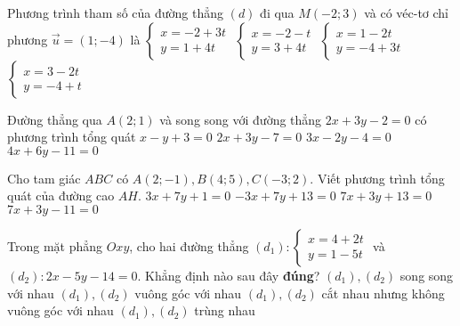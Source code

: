 \begin{ex}%
Phương trình tham số của đường thẳng $ (d) $ đi qua $ M(-2;3) $ và có véc-tơ chỉ phương $ \vec{u}=(1;-4) $ là
\choice
{$\begin{cases}	x=-2+3t\\y=1+4t \end{cases}	$}
{\True $\begin{cases}	x=-2-t\\y=3+4t \end{cases}	$}
{$\begin{cases}	x=1-2t\\y=-4+3t \end{cases}	$}
{$\begin{cases}	x=3-2t\\y=-4+t \end{cases}	$}
\end{ex}
\begin{ex}%
 Đường thẳng qua $ A(2;1) $ và song song với đường thẳng $ 2x+3y-2=0 $ có phương trình tổng quát
	\choice
	{$x-y+3=0$}
	{\True $2x+3y-7=0$}
	{$3x-2y-4=0$}
	{$4x+6y-11=0$}
\end{ex}
\begin{ex}%
 Cho tam giác $ ABC $ có $ A(2;-1), B(4;5), C(-3;2) $. Viết phương trình tổng quát của đường cao $ AH $.
	\choice
	{$3x+7y+1=0$}
	{$-3x+7y+13=0$}
	{$7x+3y+13=0$}
	{\True $7x+3y-11=0$}
\end{ex}
\begin{ex}%
	 Trong mặt phẳng $ Oxy $, cho hai đường thẳng $ (d_1):\begin{cases}
	x=4+2t\\y=1-5t
	\end{cases} $ và $ (d_2):2x-5y-14=0 $. Khẳng định nào sau đây \textbf{đúng}?
	\choice
	{$ (d_1), (d_2) $ song song với nhau}
	{\True $ (d_1), (d_2) $ vuông góc với nhau}
	{$ (d_1), (d_2) $ cắt nhau nhưng không vuông góc với nhau}
	{$ (d_1), (d_2) $ trùng nhau}
\end{ex}
